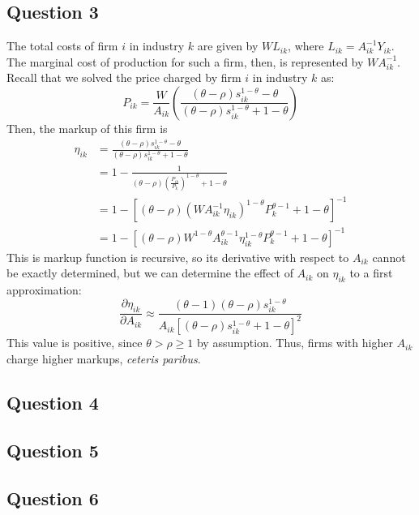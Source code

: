 \documentclass{article}
\begin{document}
\subsection*{Question 3}
The total costs of firm $i$ in industry $k$ are given by $WL_{ik}$, where ${L_{ik} = A_{ik}^{-1}Y_{ik}}$. The marginal cost of production for such a firm, then, is represented by ${WA_{ik}^{-1}}$. Recall that we solved the price charged by firm $i$ in industry $k$ as:
\[
	P_{ik} = \frac{W}{A_{ik}}\left(\frac{(\theta-\rho)s_{ik}^{1-\theta} - \theta}{(\theta-\rho)s_{ik}^{1-\theta} + 1-\theta}\right)
\]
Then, the markup of this firm is
\begin{align*}
	\eta_{ik} 	&= \frac{(\theta-\rho)s_{ik}^{1-\theta} - \theta}{(\theta-\rho)s_{ik}^{1-\theta} + 1-\theta}					\\
				&= 1 - \frac{1}{(\theta-\rho)\left(\frac{P_{ik}}{P_k}\right)^{1-\theta} + 1-\theta}								\\
				&= 1- \left[(\theta-\rho)\left(WA_{ik}^{-1}\eta_{ik}\right)^{1-\theta}P_k^{\theta-1} + 1-\theta\right]^{-1}		\\
				&= 1- \left[(\theta-\rho)W^{1-\theta}A_{ik}^{\theta-1}\eta_{ik}^{1-\theta}P_k^{\theta-1} + 1-\theta\right]^{-1}	
\end{align*}
This is markup function is recursive, so its derivative with respect to $A_{ik}$ cannot be exactly determined, but we can determine the effect of $A_{ik}$ on $\eta_{ik}$ to a first approximation:
\[
	\frac{\partial \eta_{ik}}{\partial A_{ik}} \approx \frac{(\theta-1)(\theta-\rho)s_{ik}^{1-\theta}}{A_{ik}\left[(\theta-\rho)s_{ik}^{1-\theta}+1-\theta\right]^2}
\]
This value is positive, since ${\theta>\rho\geq 1}$ by assumption. Thus, firms with higher $A_{ik}$ charge higher markups, \textit{ceteris paribus}.


\subsection*{Question 4}





\subsection*{Question 5}





\subsection*{Question 6}




\end{document}
